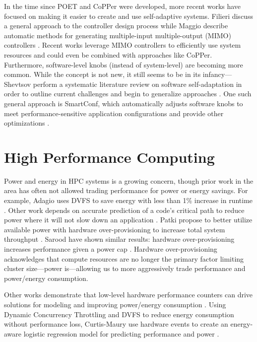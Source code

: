 In the time since POET and CoPPer were developed, more recent works have focused on making it easier to create and use self-adaptive systems.
Filieri \etal discuss a general approach to the controller design process \cite{Filieri2017} while Maggio \etal describe automatic methods for generating multiple-input multiple-output (MIMO) controllers \cite{Maggio2017}.
Recent works leverage MIMO controllers to efficiently use system resources \cite{josep-isca2016,SPECTR} and could even be combined with approaches like CoPPer.
Furthermore, software-level knobs (instead of system-level) are becoming more common.
While the concept is not new, it still seems to be in its infancy---Shevtsov \etal perform a systematic literature review on software self-adaptation in order to outline current challenges and begin to generalize approaches \cite{Shevtsov2017}.
One such general approach is SmartConf, which automatically adjusts software knobs to meet performance-sensitive application configurations and provide other optimizations \cite{SmartConf}.


\section{High Performance Computing}

Power and energy in HPC systems is a growing concern, though prior work in the area has often not allowed trading performance for power or energy savings.
For example, Adagio uses DVFS to save energy with less than 1\% increase in runtime \cite{RountreeAdagio}.
Other work depends on accurate prediction of a code's critical path to reduce power where it will not slow down an application \cite{Jitter,Marathe2015}.
Patki \etal propose to better utilize available power with hardware over-provisioning to increase total system throughput \cite{PatkiRMAP}.
Sarood \etal have shown similar results: hardware over-provisioning increases performance given a power cap \cite{Sarood2013}.
Hardware over-provisioning acknowledges that compute resources are no longer the primary factor limiting cluster size---power is---allowing us to more aggressively trade performance and power/energy consumption.

Other works demonstrate that low-level hardware performance counters can drive solutions for modeling and improving power/energy consumption \cite{Libutti2014,Sasaki,Chetsa,WuHPCComputer}.
Using Dynamic Concurrency Throttling and DVFS to reduce energy consumption without performance loss, Curtis-Maury \etal use hardware events to create an energy-aware logistic regression model for predicting performance and power \cite{Curtis-Maury2008}.

